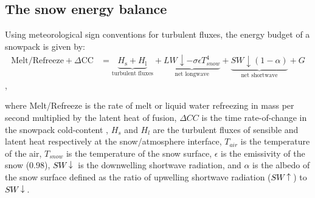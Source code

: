 \documentclass[draft]{agujournal2019}
\newcommand{\rnet}{\textcolor{black}{$R_{\mathrm{net}}$}\xspace}
\newcommand{\swdn}{\textcolor{black}{$SW\downarrow$}\xspace}
\newcommand{\swup}{\textcolor{black}{$SW\uparrow$}\xspace}
\begin{document}



\subsection{The snow energy balance}\label{sec:snow_seb}
Using meteorological sign conventions for turbulent fluxes, the energy budget of a snowpack is given by:
\begin{align}\label{eq:energy_budget}
\mathrm{Melt}/ \mathrm{Refreeze} + \Delta \mathrm{CC}
&=
\underbrace{
    H_\mathrm{s} + H_\mathrm{l}
}_{\text{turbulent fluxes}}
+
\underbrace{
LW\downarrow- \sigma\epsilon T_{snow}^4
}_{\text{net longwave}}
+
\underbrace{
   SW\downarrow(1-\alpha)
}_{\text{net shortwave}}
+
G
\end{align},

where Melt/Refreeze is the rate of melt or liquid water refreezing in mass per second multiplied by the latent heat of fusion, $\Delta CC$ is the time rate-of-change in the snowpack cold-content \cite{Jennings2018-wz}, $H_s$ and $H_l$ are the turbulent fluxes of sensible and latent heat respectively at the snow/atmosphere interface, $T_{air}$ is the temperature of the air, $T_{snow}$ is the temperature of the snow surface, $\epsilon$ is the emissivity of the snow (0.98), \swdn is the downwelling shortwave radiation, and $\alpha$ is the albedo of the snow surface defined as the ratio of upwelling shortwave radiation (\swup) to \swdn.
\end{document}
